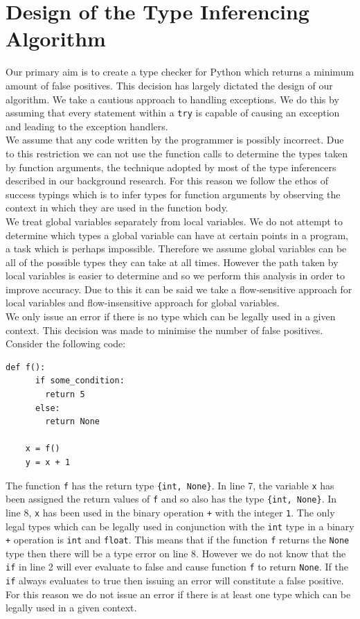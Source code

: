 \documentclass[12pt, titlepage]{article}
\begin{document}
\section{Design of the Type Inferencing Algorithm}
\label{chap:designAlg}
Our primary aim is to create a type checker for Python which returns a minimum amount of false positives. This decision has largely dictated the design of our algorithm. We take a cautious approach to handling exceptions. We do this by assuming that every statement within a \texttt{try} is capable of causing an exception and leading to the exception handlers. \\
\indent We assume that any code written by the programmer is possibly incorrect. Due to this restriction we can not use the function calls to determine the types taken by function arguments, the technique adopted by most of the type inferencers described in our background research. For this reason we follow the ethos of success typings which is to infer types for function arguments by observing the context in which they are used in the function body. \\
\indent We treat global variables separately from local variables. We do not attempt to determine which types a global variable can have at certain points in a program, a task which is perhaps impossible. Therefore we assume global variables can be all of the possible types they can take at all times. However the path taken by local variables is easier to determine and so we perform this analysis in order to improve accuracy. Due to this it can be said we take a flow-sensitive approach for local variables and flow-insensitive approach for global variables.  \\
\indent We only issue an error if there is no type which can be legally used in a given context. This decision was made to minimise the number of false positives. Consider the following code:
\begin{lstlisting}[mathescape]
    def f():
      if some_condition:
        return 5
      else:
        return None
        
    x = f()
    y = x + 1
\end{lstlisting}
The function \texttt{f} has the return type \texttt{\{int, None\}}. In line 7, the variable \texttt{x} has been assigned the return values of \texttt{f} and so also has the type \texttt{\{int, None\}}. In line 8, \texttt{x} has been used in the binary operation \texttt{+} with the integer \texttt{1}. The only legal types which can be legally used in conjunction with the \texttt{int} type in a binary \texttt{+} operation is \texttt{int} and \texttt{float}. This means that if the function \texttt{f} returns the \texttt{None} type then there will be a type error on line 8. However we do not know that the \texttt{if} in line 2 will ever evaluate to false and cause function \texttt{f} to return \texttt{None}. If the \texttt{if} always evaluates to true then issuing  an error will constitute a false positive. For this reason we do not issue an error if there is at least one type which can be legally used in a given context.
\end{document}
